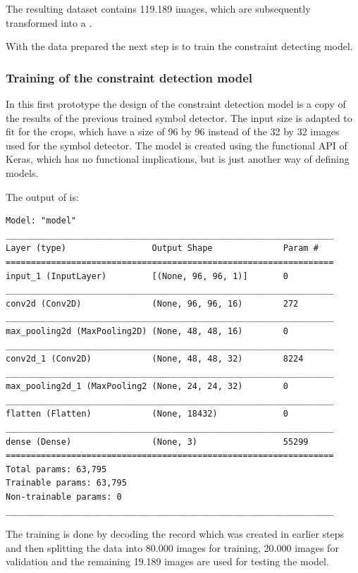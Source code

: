 The resulting dataset contains 119.189 images, which are subsequently transformed into a .


With the data prepared the next step is to train the constraint detecting model.

\subsubsection{Training of the constraint detection model}

In this first prototype the design of the constraint detection model is a copy of the results of the previous trained symbol detector.
The input size is adapted to fit for the crops, which have a size of 96 by 96 instead of the 32 by 32 images used for the symbol detector.
The model is created using the functional API of Keras, which has no functional implications, but is just another way of defining models.

The output of  is:
\begin{lstlisting}
Model: "model"
_________________________________________________________________
Layer (type)                 Output Shape              Param #   
=================================================================
input_1 (InputLayer)         [(None, 96, 96, 1)]       0         
_________________________________________________________________
conv2d (Conv2D)              (None, 96, 96, 16)        272       
_________________________________________________________________
max_pooling2d (MaxPooling2D) (None, 48, 48, 16)        0         
_________________________________________________________________
conv2d_1 (Conv2D)            (None, 48, 48, 32)        8224      
_________________________________________________________________
max_pooling2d_1 (MaxPooling2 (None, 24, 24, 32)        0         
_________________________________________________________________
flatten (Flatten)            (None, 18432)             0         
_________________________________________________________________
dense (Dense)                (None, 3)                 55299     
=================================================================
Total params: 63,795
Trainable params: 63,795
Non-trainable params: 0
_________________________________________________________________    
\end{lstlisting}

The training is done by decoding the record which was created in earlier steps
and then splitting the data into 80.000 images for training, 20.000 images for validation and the remaining 19.189 images are used for testing the model.

